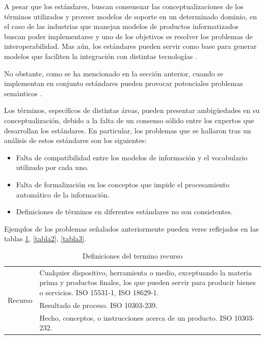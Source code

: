 \documentclass[journal]{IEEEtran}
\begin{document}
A pesar que los est\'andares, buscan consensuar las conceptualizaciones de los t\'erminos utilizados y proveer modelos de soporte en un determinado dominio, en el caso de las industrias que manejan modelos de productos informatizados buscan poder implementarse y uno de los objetivos es resolver los problemas de interoperabilidad. Mas a\'un, los est\'andares pueden servir como base para generar modelos que faciliten la integraci\'on con distintas tecnolog\'ias \cite{Irisarri2016AIndustry}.

No obstante, como se ha mencionado en la secci\'on anterior, cuando se implementan en conjunto est\'andares pueden provocar potenciales problemas sem\'anticos \cite{Young2007}. 

Los t\'erminos, espec\'ificos de distintas \'areas, pueden presentar ambig\"uedades en su conceptualizaci\'on, debido a la falta de un consenso s\'olido entre los expertos que desarrollan los est\'andares. En particular, los problemas que se hallaron tras un an\'alisis de estos est\'andares son los siguientes:

\begin{itemize}
    \item Falta de compatibilidad entre los modelos de informaci\'on y el vocabulario utilizado por cada uno.
    \item Falta de formalizaci\'on en los conceptos que impide el procesamiento autom\'atico de la informaci\'on. 
    \item Definiciones de t\'erminos en diferentes est\'andares no son consistentes. 
\end{itemize}

Ejemplos de los problemas se\~{n}alados anteriormente pueden verse reflejados en las tablas \ref{tabla1}, \ref{tabla2}, \ref{tabla3}. 

\begin{table}[!t]
\renewcommand{\arraystretch}{1.3}
\caption{Definiciones del termino recurso}
\label{tabla1}
\centering
\begin{tabular}{|c|p{6cm}|}
\hline
\multirow{3}{*}{Recurso} & Cualquier dispositivo, herramienta o medio, exceptuando la materia prima y productos finales, los que pueden servir para producir bienes o servicios. ISO 15531-1, ISO 18629-1.\\ \cline{2-2}
                         & Resultado de proceso. ISO 10303-239.\\ \cline{2-2}
                         & Hecho, conceptos, o instrucciones acerca de un producto. ISO 10303-232. \\  \hline                                                                                                     
\end{tabular}
\end{table}
\end{document}
